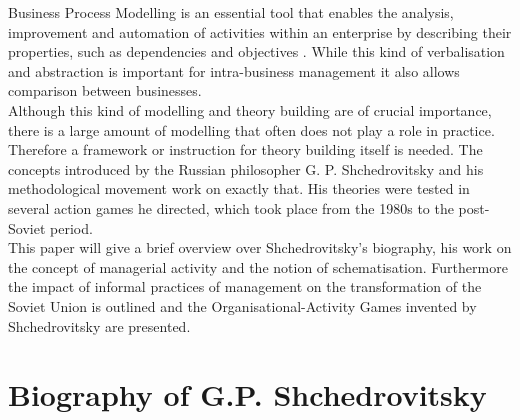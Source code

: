 \documentclass[11pt,a4paper]{article}
\begin{document}
Business Process Modelling is an essential tool that enables the analysis, improvement and automation of activities within an enterprise by describing their properties, such as dependencies and objectives \cite[p. 129ff.]{AguilarSavn2004}. While this kind of verbalisation and abstraction is important for intra-business management it also allows comparison between businesses. \\
Although this kind of modelling and theory building are of crucial importance, there is a large amount of modelling that often does not play a role in practice. Therefore a framework or instruction for theory building itself is needed. The concepts introduced by the Russian philosopher G. P. Shchedrovitsky and his methodological movement work on exactly that. His theories were tested in several action games he directed, which took place from the 1980s to the post-Soviet period. \\
This paper will give a brief overview over Shchedrovitsky's biography, his work on the concept of managerial activity and the notion of schematisation. Furthermore the impact of informal practices of management on the transformation of the Soviet Union is outlined and the Organisational-Activity Games invented by Shchedrovitsky are presented.


\section{Biography of G.P. Shchedrovitsky}
\end{document}
